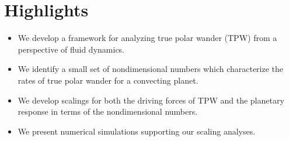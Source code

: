 \documentclass{article}
\begin{document}
\section*{Highlights}

\begin{itemize}
\item We develop a framework for analyzing true polar wander (TPW) from a perspective of fluid dynamics.
\item We identify a small set of nondimensional numbers which characterize the rates of true polar wander for a convecting planet.
\item We develop scalings for both the driving forces of TPW and the planetary response in terms of the nondimensional numbers.
\item We present numerical simulations supporting our scaling analyses.
\end{itemize}
\end{document}
